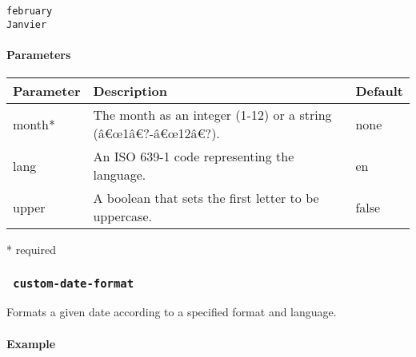 \begin{verbatim}
february
Janvier
\end{verbatim}

\paragraph{Parameters}\label{parameters-1}

\begin{Shaded}
\begin{Highlighting}[]
\end{Highlighting}
\end{Shaded}

\begin{longtable}[]{@{}lll@{}}
\toprule\noalign{}
Parameter & Description & Default \\
\midrule\noalign{}
\endhead
\bottomrule\noalign{}
\endlastfoot
month* & The month as an integer (1-12) or a string (â€œ1â€?-â€œ12â€?).
& none \\
lang & An ISO 639-1 code representing the language. & en \\
upper & A boolean that sets the first letter to be uppercase. & false \\
\end{longtable}

* required

\subsubsection{\texorpdfstring{\texttt{\ custom-date-format\ }}{ custom-date-format }}\label{custom-date-format}

Formats a given date according to a specified format and language.

\paragraph{Example}\label{example-2}

\begin{Shaded}
\begin{Highlighting}[]

\end{Highlighting}
\end{Shaded}


